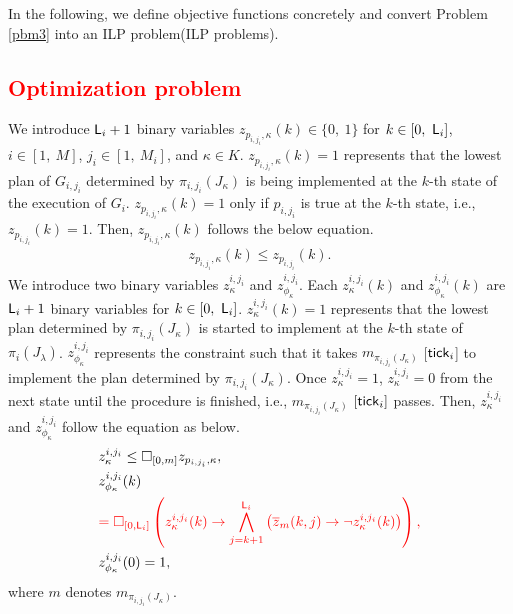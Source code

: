 \documentclass[journal,twoside,web]{IEEEtran}
\newcommand{\tick}{{\sf tick}}
\newcommand{\Len}{{\sf L}}
\newcommand{\G}[1]{\Box_{[#1]}}
\newcommand{\red}[1]{\textcolor{red}{#1}}
\begin{document}
In the following, we define objective functions concretely and convert Problem \ref{pbm3} into an ILP problem(ILP problems).
\red{
\subsection{Optimization problem}}
%
%
We introduce $\Len_i + 1$ binary variables $z_{p_{i,{j_i}},\kappa}(k)\in\{0,~1\}$ for $k\in[0,~\Len_i]$, $i\in[1,~M]$, $j_i\in[1,~M_i]$, and $\kappa\in K$.
$z_{p_{i,{j_i}},\kappa}(k)=1$ represents that the lowest plan of $G_{i,{j_i}}$ determined by $\pi_{i,j_i}(J_\kappa)$ is being  implemented at the $k$-th state of the execution of $G_i$.
$z_{p_{i,{j_i}},\kappa}(k)=1$ only if $p_{i,{j_i}}$ is true at the $k$-th state, i.e., $z_{p_{i,{j_i}}}(k)=1$.
Then, $z_{p_{i,{j_i}},\kappa}(k)$ follows the below equation.
\begin{align}\label{hier1}
{z}_{p_{i,{j_i}},\kappa}(k) \leq z_{p_{i,{j_i}}}(k).
\end{align}
%
We introduce two binary variables ${z}^{i,j_i}_\kappa$ and $z^{i,j_i}_{\phi_\kappa}$.
Each ${z}^{i,{j_i}}_\kappa(k)$ and $z^{i,{j_i}}_{\phi_\kappa}(k)$ are $\Len_i + 1$ binary variables for $k\in[0,~\Len_i]$.
${z}^{i,j_i}_\kappa(k)=1$ represents that the lowest plan determined by $\pi_{i,j_i}(J_\kappa)$ is started to implement at the $k$-th state of $\pi_i(J_\lambda)$.
$z^{i,j_i}_{\phi_\kappa}$ represents the constraint such that it takes $m_{\pi_{i,{j_i}}(J_\kappa)}$ [$\tick_i$] to implement the plan determined by $\pi_{i,{j_i}}(J_\kappa)$.
Once ${z}^{i,j_i}_\kappa=1$, ${z}^{i,j_i}_\kappa=0$ from the next state until the procedure is finished, i.e., $m_{\pi_{i,j_i}(J_\kappa)}$ $[\tick_i]$ passes.
%
Then, ${z}^{i,j_i}_\kappa$ and $z^{i,j_i}_{\phi_\kappa}$ follow the equation as below.
%
\begin{align}
&{z}^{i,j_i}_\kappa
\leq\G{0,m} z_{p_{i,j_i},\kappa},\label{hier2-1}\\
&z^{i,j_i}_{\phi_\kappa} (k)
\notag \\
&\red{=\G{0,\Len_i}
\left(
{z}_\kappa^{i,j_i} (k)\to
\bigwedge_{j=k+1}^{\Len_i}
\left(
\overline{z}_{m}
(k,j)\to \lnot {z}^{i,j_i}_\kappa (k)
\right)
\right),}\label{hier2-2}\\
&z^{i,{j_i}}_{\phi_\kappa}(0)=1 ,
\end{align}
where $m$ denotes $m_{\pi_{i,j_i}(J_\kappa)}$.
\end{document}
